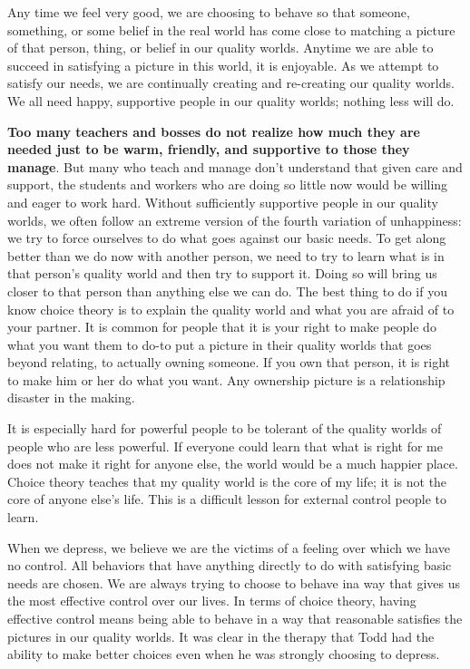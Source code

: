 \documentclass[ebook,12pt,oneside,openany]{memoir}
\begin{document}
Any time we feel very good, we are choosing to behave so that someone, something, or some belief in the real world has come close to matching a picture of that person, thing, or belief in our quality worlds.
Anytime we are able to succeed in satisfying a picture in this world, it is enjoyable. 
As we attempt to satisfy our needs, we are continually creating and re-creating our quality worlds.
We all need happy, supportive people in our quality worlds; nothing less will do. 

\textbf{Too many teachers and bosses do not realize how much they are needed just to be warm, friendly, and supportive to those they manage}.
But many who teach and manage don't understand that given care and support, the students and workers who are doing so little now would be willing and eager to work hard.
Without sufficiently supportive people in our quality worlds, we often follow an extreme version of the fourth variation of unhappiness: we try to force ourselves to do what goes against our basic needs.
To get along better than we do now with another person, we need to try to learn what is in that person's quality world and then try to support it.
Doing so will bring us closer to that person than anything else we can do.
The best thing to do if you know choice theory is to explain the quality world and what you are afraid of to your partner.
It is common for people that it is your right to make people do what you want them to do-to put a picture in their quality worlds that goes beyond relating, to actually owning someone.
If you own that person, it is right to make him or her do what you want.
Any ownership picture is a relationship disaster in the making. 

It is especially hard for powerful people to be tolerant of the quality worlds of people who are less powerful. 
If everyone could learn that what is right for me does not make it right for anyone else, the world would be a much happier place.
Choice theory teaches that my quality world is the core of my life; it is not the core of anyone else's life. This is a difficult lesson for external control people to learn.

When we depress, we believe we are the victims of a feeling over which we have no control.
All behaviors that have anything directly to do with satisfying basic needs are chosen.
We are always trying to choose to behave ina way that gives us the most effective control over our lives.
In terms of choice theory, having effective control means being able to behave in a way that reasonable satisfies the pictures in our quality worlds.
It was clear in the therapy that Todd had the ability to make better choices even when he was strongly choosing to depress.
\end{document}
